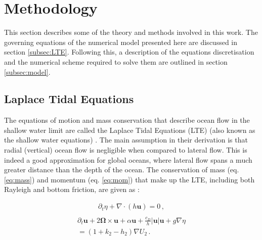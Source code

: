 \section{Methodology}

This section describes some of the theory and methods involved in this work. The governing equations of the numerical model presented here are discussed in section \ref{subsec:LTE}. Following this, a description of the equations discretisation and the numerical scheme required to solve them are outlined in section \ref{subsec:model}.

\subsection{Laplace Tidal Equations \label{subsec:LTE}}

The equations of motion and mass conservation that describe ocean flow in the shallow water limit are called the Laplace Tidal Equations (LTE) (also known as the shallow water equations) \citep{lamb1932hydrodynamics}. The main assumption in their derivation is that radial (vertical) ocean flow is negligible when compared to lateral flow. This is indeed a good approximation for global oceans, where lateral flow spans a much greater distance than the depth of the ocean. The conservation of mass (eq. \ref{eq:mass}) and momentum (eq. \ref{eq:mom}) that make up the LTE, including both Rayleigh and bottom friction, are given as \citep{sears1995tidal,tyler2008strong,matsuyama2014tidal}:


\vspace{-0.5cm}
\begin{equation}
\begin{split}
\partial_t \eta + \nabla \cdot \left(h \bm{u}\right) = 0\, , \label{eq:mass}\\ 
\end{split}
\end{equation}
\begin{equation}
\begin{split}
\partial_t \bm{u} + 2 \bm{\Omega} \times \bm{u} + \alpha\bm{u} + \frac{c_D}{h} \left|\bm{u}\right| \bm{u}  + g \nabla \eta \\ = (1 + k_2 - h_2) \nabla U_2 \, . \label{eq:mom}\\ 
\end{split}
\end{equation}

